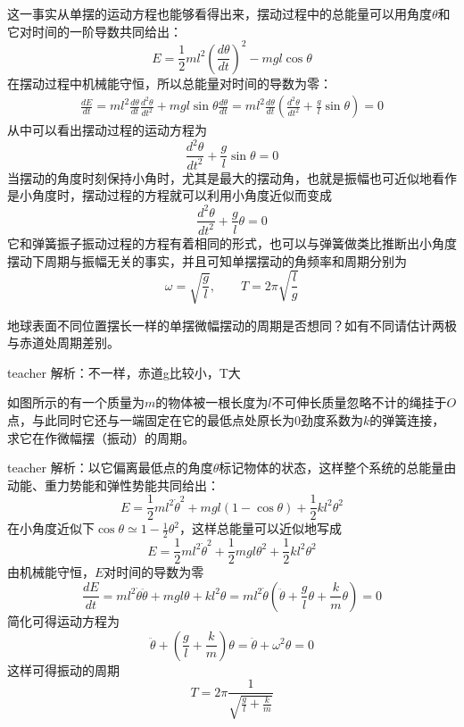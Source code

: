 这一事实从单摆的运动方程也能够看得出来，摆动过程中的总能量可以用角度$\theta$和它对时间的一阶导数共同给出：
\begin{equation}
E = \frac{1}{2}ml^2\left(\frac{d\theta}{dt}\right)^2-mgl\cos\theta
\end{equation}
在摆动过程中机械能守恒，所以总能量对时间的导数为零：
\begin{eqnarray}
\frac{dE}{dt} = ml^2\frac{d\theta}{dt}\frac{d^2\theta}{dt^2}+mgl\sin\theta\frac{d\theta}{dt}  = ml^2\frac{d\theta}{dt}\left(\frac{d^2\theta}{dt^2}+\frac{g}{l}\sin\theta\right)=0
\end{eqnarray}
从中可以看出摆动过程的运动方程为
\begin{equation}
\frac{d^2\theta}{dt^2}+\frac{g}{l}\sin\theta=0
\end{equation}
当摆动的角度时刻保持小角时，尤其是最大的摆动角，也就是振幅也可近似地看作是小角度时，摆动过程的方程就可以利用小角度近似而变成
\begin{equation}
\frac{d^2\theta}{dt^2}+\frac{g}{l}\theta=0
\end{equation}
它和弹簧振子振动过程的方程有着相同的形式，也可以与弹簧做类比推断出小角度摆动下周期与振幅无关的事实，并且可知单摆摆动的角频率和周期分别为
\begin{equation}
\omega = \sqrt{\frac{g}{l}},\qquad T = 2\pi\sqrt{\frac{l}{g}}
\end{equation}

\begin{example}
地球表面不同位置摆长一样的单摆微幅摆动的周期是否想同？如有不同请估计两极与赤道处周期差别。
\begin{taggedblock}{teacher}
\newline
解析：不一样，赤道g比较小，T大
\end{taggedblock}
\end{example}

\begin{example}
如图所示的有一个质量为$m$的物体被一根长度为$l$不可伸长质量忽略不计的绳挂于$O$点，与此同时它还与一端固定在它的最低点处原长为0劲度系数为$k$的弹簧连接，求它在作微幅摆（振动）的周期。
\begin{taggedblock}{teacher}
\newline
解析：以它偏离最低点的角度$\theta$标记物体的状态，这样整个系统的总能量由动能、重力势能和弹性势能共同给出：
\[
E = \frac{1}{2}ml^2\dot{\theta}^2+mgl(1-\cos\theta)+\frac{1}{2}kl^2\theta^2
\]
在小角度近似下$\cos\theta\simeq 1-\frac{1}{2}\theta^2$，这样总能量可以近似地写成
\[
E = \frac{1}{2}ml^2\dot{\theta}^2+\frac{1}{2}mgl\theta^2+\frac{1}{2}kl^2\theta^2
\]
由机械能守恒，$E$对时间的导数为零
\[
\frac{dE}{dt}=ml^2\dot{\theta}\ddot{\theta}+mgl\theta+kl^2\theta = ml^2\dot{\theta}(\ddot{\theta}+\frac{g}{l}\theta+\frac{k}{m}\theta)=0
\]
简化可得运动方程为
\[
\ddot{\theta}+(\frac{g}{l}+\frac{k}{m})\theta=\ddot{\theta}+\omega^2\theta=0
\]
这样可得振动的周期
\[
T = 2\pi\frac{1}{\sqrt{\frac{g}{l}+\frac{k}{m}}}
\]
\end{taggedblock}
\end{example}



